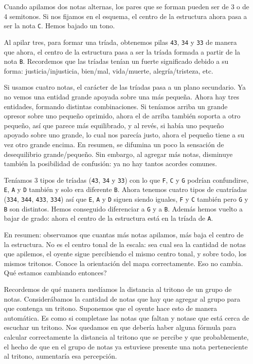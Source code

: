 \documentclass[]{report}
\begin{document}
Cuando apilamos dos notas alternas, los pares que se forman pueden ser de 3 o de 4 semitonos. Si nos fijamos en el esquema, el centro de la estructura ahora pasa a ser la nota \texttt{C}. Hemos bajado un tono.

Al apilar tres, para formar una tríada, obtenemos pilas \texttt{43}, \texttt{34} y \texttt{33} de manera que ahora, el centro de la estructura pasa a ser la tríada formada a partir de la nota \texttt{B}. Recordemos que las tríadas tenían un fuerte significado debido a su forma: justicia/injusticia, bien/mal, vida/muerte, alegría/tristeza, etc.

Si usamos cuatro notas, el carácter de las tríadas pasa a un plano secundario. Ya no vemos una entidad grande apoyada sobre una más pequeña. Ahora hay tres entidades, formando distintas combinaciones. Si teníamos arriba un grande opresor sobre uno pequeño oprimido, ahora el de arriba también soporta a otro pequeño, así que parece más equilibrado, y al revés, si había uno pequeño apoyado sobre uno grande, lo cual nos parecía justo, ahora el pequeño tiene a su vez otro grande encima. En resumen, se difumina un poco la sensación de desequilibrio grande/pequeño. Sin embargo, al agregar más notas, disminuye también la posibilidad de confusión: ya no hay tantos acordes comunes.

Teníamos 3 tipos de tríadas (\texttt{43}, \texttt{34} y \texttt{33}) con lo que \texttt{F}, \texttt{C} y \texttt{G} podrían confundirse, \texttt{E}, \texttt{A} y \texttt{D} también y solo era diferente \texttt{B}. Ahora tenemos cuatro tipos de cuatríadas (\texttt{334}, \texttt{344}, \texttt{433}, \texttt{334}) así que \texttt{E}, \texttt{A} y \texttt{D} siguen siendo iguales, \texttt{F} y \texttt{C} también pero \texttt{G} y \texttt{B} son distintos. Hemos conseguido diferenciar a \texttt{G} y a \texttt{B}. Además hemos vuelto a bajar de grado: ahora el centro de la estructura está en la tríada de \texttt{A}.

En resumen: observamos que cuantas más notas apilamos, más baja el centro de la estructura. No es el centro tonal de la escala: sea cual sea la cantidad de notas que apilemos, el oyente sigue percibiendo el mismo centro tonal, y sobre todo, los mismos tritonos. Conoce la orientación del mapa correctamente. Eso no cambia. Qué estamos cambiando entonces?

Recordemos de qué manera medíamos la distancia al tritono de un grupo de notas. Considerábamos la cantidad de notas que hay que agregar al grupo para que contenga un tritono. Suponemos que el oyente hace esto de manera automática. Es como si completase las notas que faltan y notase que está cerca de escuchar un tritono. Nos quedamos en que debería haber alguna fórmula para calcular correctamente la distancia al tritono que se percibe y que probablemente, el hecho de que en el grupo de notas ya estuviese presente una nota perteneciente al tritono, aumentaría esa percepción.
\end{document}
